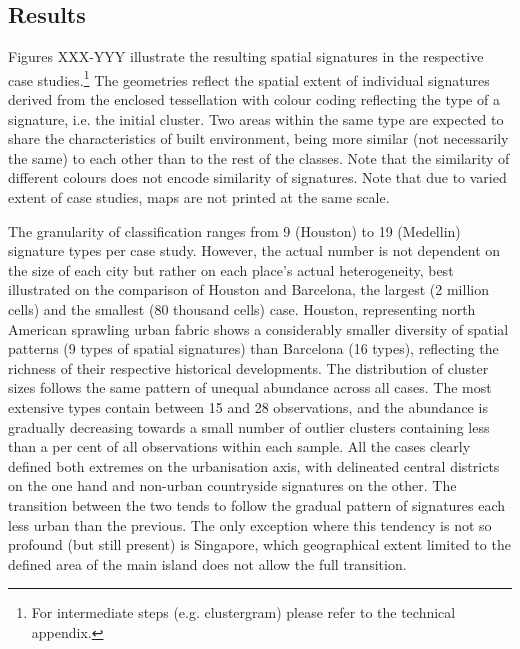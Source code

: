 \subsection{Results}

Figures XXX-YYY illustrate the resulting spatial signatures in the respective case
studies.\footnote{For intermediate steps (e.g. clustergram) please refer to the
technical appendix.} The geometries reflect the spatial extent of individual
signatures derived from the enclosed tessellation
with colour coding reflecting the type of a signature, i.e. the initial cluster. Two
areas within the same type are expected to share the characteristics of built
environment, being more similar (not necessarily the same) to each other than to
the rest of the classes. Note that the similarity of different colours does not
encode similarity of signatures. Note that due to varied extent of case studies,
maps are not printed at the same scale.

The granularity of classification ranges from 9 (Houston) to 19 (Medellin)
signature types per case study. However, the actual number is not dependent on
the size of each city but rather on each place's actual heterogeneity, best
illustrated on the comparison of Houston and Barcelona, the largest (2 million
cells) and the smallest (80 thousand cells) case. Houston, representing north
American sprawling urban fabric shows a considerably smaller diversity of
spatial patterns (9 types of spatial signatures) than Barcelona (16 types),
reflecting the richness of their respective historical developments.
The distribution of cluster sizes follows the same pattern of unequal abundance
across all cases. The most extensive types contain between 15 and 28%
observations, and the abundance is gradually decreasing towards a small number
of outlier clusters containing less than a per cent of all observations within
each sample.
All the cases clearly defined both extremes on the urbanisation axis, with
delineated central districts on the one hand and non-urban countryside
signatures on the other. The transition between the two tends to follow the
gradual pattern of signatures each less urban than the previous. The only
exception where this tendency is not so profound (but still present) is
Singapore, which geographical extent limited to the defined area of the main
island does not allow the full transition.


